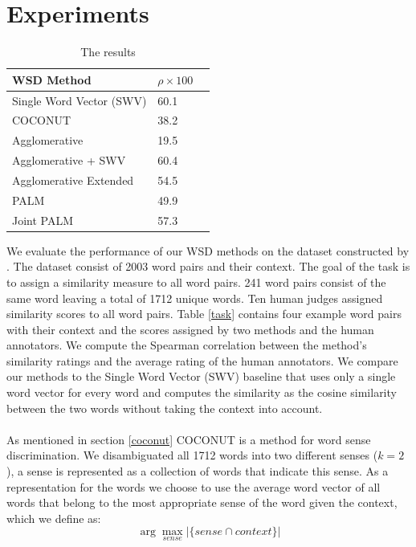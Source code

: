 \documentclass[11pt]{article}
\begin{document}
\section{Experiments}
\begin{table}
\center
    \begin{tabular}{|l|l|l|}
    \hline
    \textbf{WSD Method} & $\rho \times 100$ \\ \hline
    Single Word Vector (SWV) & 60.1 \\ \hline
    COCONUT & 38.2 \\ \hline
    Agglomerative & 19.5 \\ \hline
    Agglomerative + SWV & 60.4 \\ \hline
    Agglomerative Extended & 54.5 \\ \hline
    PALM & 49.9 \\ \hline
    Joint PALM & 57.3 \\ \hline
    \end{tabular}
    \caption{The results}
    \label{results}
\end{table}
We evaluate the performance of our WSD methods on the dataset constructed by \cite{global}. The dataset consist of 2003 word pairs and their context. The goal of the task is to assign a similarity measure to all word pairs. 241 word pairs consist of the same word leaving a total of 1712 unique words. Ten human judges assigned similarity scores to all word pairs. Table \ref{task} contains four example word pairs with their context and the scores assigned by two methods and the human annotators. We compute the Spearman correlation between the method's similarity ratings and the average rating of the human annotators. We compare our methods to the Single Word Vector (SWV) baseline that uses only a single word vector for every word and computes the similarity as the cosine similarity between the two words without taking the context into account. \\\\
As mentioned in section \ref{coconut} COCONUT is a method for word sense discrimination. We disambiguated all 1712 words into two different senses ($k = 2$), a sense is represented as a collection of words that indicate this sense. As a representation for the words we choose to use the average word vector of all words that belong to the most appropriate sense of the word given the context, which we define as:
\begin{equation}\label{sense} \arg\max_{\textit{sense}}  | \{\textit{sense} \cap \textit{context}\} |\end{equation}
\end{document}
